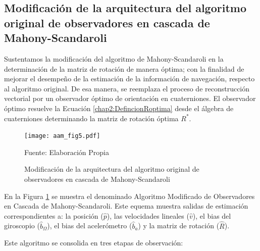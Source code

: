 \documentclass[10pt]{report}
\numberwithin{equation}{chapter}
\numberwithin{algorithm}{chapter}
\begin{document}
\subsection{Modificación de la arquitectura del algoritmo original de observadores en cascada de Mahony-Scandaroli}
Sustentamos la modificación del algoritmo de Mahony-Scandaroli en la determinación de la matriz de rotación de manera óptima; con la finalidad de mejorar el desempeño de la estimación de la información de navegación, respecto al algoritmo original. De esa manera, se reemplaza el proceso de reconstrucción vectorial por un observador óptimo de orientación en cuaterniones. El observador óptimo resuelve la Ecuación \eqref{chap2:DefincionRoptima} desde el álgebra de cuaterniones determinando la matriz de rotación óptima $R^*$.\par
\begin{figure}[t]
\begin{center}
\texttt{[image: aam\_fig5.pdf]}
\caption{Modificación de la arquitectura del algoritmo original de observadores en cascada de Mahony-Scandaroli}\scriptsize{Fuente: Elaboración Propia}
\label{arq_fig5}
\end{center}
\end{figure}
En la Figura \ref{arq_fig5} se muestra el denominado Algoritmo Modificado de Observadores en Cascada de Mahony-Scandaroli. Este equema muestra salidas de estimación correspondientes a: la posición ($\hat{p}$), las velocidades lineales ($\hat{v}$), el bias del giroscopio ($\hat{b}_\Omega$), el bias del acelerómetro ($\hat{b}_a$) y la matriz de rotación ($\hat{R}$).\par
Este algoritmo se consolida en tres etapas de observación:
\end{document}
